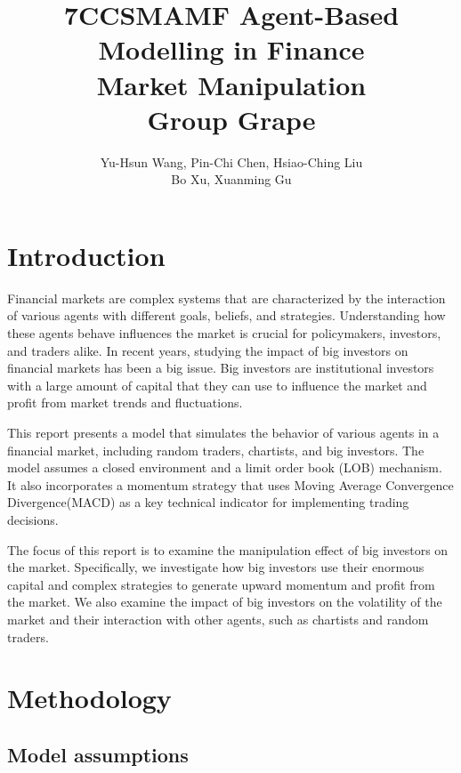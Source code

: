 \documentclass[a4paper, 12pt]{article}
\title{7CCSMAMF Agent-Based Modelling in Finance\\
Market Manipulation\\
Group Grape}
\author{Yu-Hsun Wang, Pin-Chi Chen, Hsiao-Ching Liu \\ Bo Xu, Xuanming Gu}
\date{} %
\begin{document}
\maketitle
\thispagestyle{empty}
\newpage
\setcounter{page}{1}
\section{Introduction}
Financial markets are complex systems that are characterized by the interaction of various agents with different goals, beliefs, and strategies. Understanding how these agents behave influences the market is crucial for policymakers, investors, and traders alike. In recent years, studying the impact of big investors on financial markets has been a big issue. Big investors are institutional investors with a large amount of capital that they can use to influence the market and profit from market trends and fluctuations.\par

This report presents a model that simulates the behavior of various agents in a financial market, including random traders, chartists, and big investors. The model assumes a closed environment and a limit order book (LOB) mechanism. It also incorporates a momentum strategy that uses Moving Average Convergence Divergence(MACD) as a key technical indicator for implementing trading decisions.\par

The focus of this report is to examine the manipulation effect of big investors on the market. Specifically, we investigate how big investors use their enormous capital and complex strategies to generate upward momentum and profit from the market. We also examine the impact of big investors on the volatility of the market and their interaction with other agents, such as chartists and random traders.



\section{Methodology}
    \subsection{Model assumptions}
\end{document}
